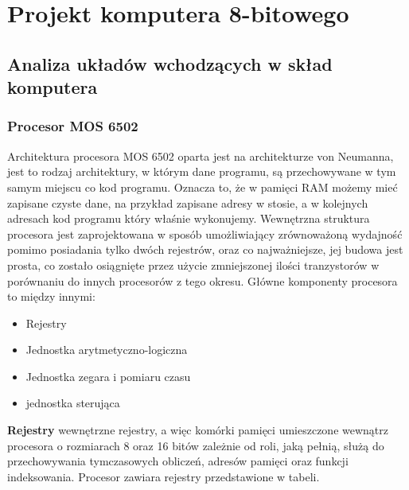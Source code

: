 \begingroup
\let\clearpage\relax
\chapter{Projekt komputera 8-bitowego}
\section{Analiza układów wchodzących w skład komputera}
\subsection{Procesor MOS 6502}
Architektura procesora MOS 6502 oparta jest na architekturze von Neumanna, jest to rodzaj architektury, w którym dane programu, są przechowywane w tym samym miejscu co kod programu. Oznacza to, że w pamięci RAM możemy mieć zapisane czyste dane, na przykład zapisane adresy w stosie, a w kolejnych adresach kod programu który właśnie wykonujemy. Wewnętrzna struktura procesora jest zaprojektowana w sposób umożliwiający zrównoważoną wydajność pomimo posiadania tylko dwóch rejestrów, oraz co najważniejsze, jej budowa jest prosta, co zostało osiągnięte przez użycie zmniejszonej ilości tranzystorów w porównaniu do innych procesorów z tego okresu.
Główne komponenty procesora to między innymi:
\begin{itemize}
\item Rejestry
\item Jednostka arytmetyczno-logiczna
\item Jednostka zegara i pomiaru czasu
\item jednostka sterująca 
\end{itemize}
\hfill \break
\textbf{Rejestry} wewnętrzne rejestry, a więc komórki pamięci umieszczone wewnątrz procesora o rozmiarach 8 oraz 16 bitów zależnie od roli, jaką pełnią, służą do przechowywania  tymczasowych obliczeń, adresów pamięci oraz funkcji indeksowania. Procesor zawiara rejestry przedstawione w tabeli.

